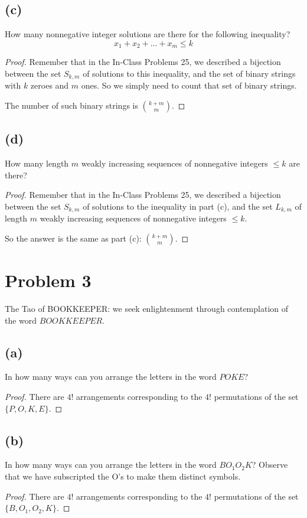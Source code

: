 \documentclass[14pt]{extarticle}
\newcommand{\dps}{\displaystyle}
\begin{document}
\subsection{(c)}
How many nonnegative integer solutions are there for the following inequality?
$$
x_1 + x_2 + \ldots + x_m \leq k
$$
\begin{proof}
Remember that in the In-Class Problems 25, we described a bijection between the set $S_{k,m}$ of solutions to this inequality, and the set of binary strings with $k$ zeroes and $m$ ones. So we simply need to count that set of binary strings.

The number of such binary strings is $\dps\binom{k+m}{m}$.
\end{proof}

\subsection{(d)}
How many length $m$ weakly increasing sequences of nonnegative integers $\leq k$ are there?
\begin{proof}
Remember that in the In-Class Problems 25, we described a bijection between the set $S_{k,m}$ of solutions to the inequality in part (c), and the set $L_{k,m}$ of length $m$ weakly increasing sequences of nonnegative integers $\leq k$.

So the answer is the same as part (c): $\dps\binom{k+m}{m}$.
\end{proof}

\section{Problem 3}
The Tao of BOOKKEEPER: we seek enlightenment through contemplation of the word $BOOKKEEPER$.

\subsection{(a)}
In how many ways can you arrange the letters in the word $POKE$?
\begin{proof}
There are $4!$ arrangements corresponding to the $4!$ permutations of the set $\{P, O, K, E\}$.
\end{proof}

\subsection{(b)}
In how many ways can you arrange the letters in the word $BO_1 O_2 K$? Observe that we have subscripted the O’s to make them distinct symbols.
\begin{proof}
There are $4!$ arrangements corresponding to the $4!$ permutations of the set $\{B, O_1 , O_2 , K\}$.
\end{proof}
\end{document}
